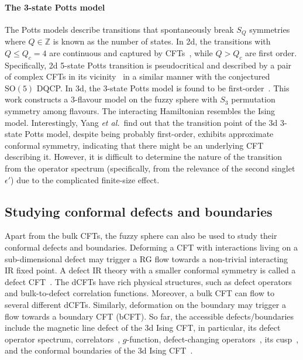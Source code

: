 \documentclass{timesjhep}
\begin{document}
\paragraph{The 3-state Potts model~\cite{Yang2025}}

The Potts models describe transitions that spontaneously break $S_Q$ symmetries where $Q\in\mathbb{Z}$ is known as the number of states. In 2d, the transitions with $Q\leq Q_c=4$ are continuous and captured by CFTs~\cite{Dotsenko1984Potts}, while $Q>Q_c$ are first order. Specifically, 2d 5-state Potts transition is pseudocritical and described by a pair of complex CFTs in its vicinity~\cite{Tang2024Potts} in a similar manner with the conjectured $\mathrm{SO}(5)$ DQCP. In 3d, the 3-state Potts model is found to be first-order~\cite{Barkema1991Potts,Chester2022Potts}. This work constructs a 3-flavour model on the fuzzy sphere with $S_3$ permutation symmetry among flavours. The interacting Hamiltonian resembles the Ising model. Interestingly, Yang \textit{et al.}~find out that the transition point of the 3d 3-state Potts model, despite being probably first-order, exhibits approximate conformal symmetry, indicating that there might be an underlying CFT describing it. However, it is difficult to determine the nature of the transition from the operator spectrum (specifically, from the relevance of the second singlet $\epsilon'$) due to the complicated finite-size effect.

\subsection{Studying conformal defects and boundaries}

Apart from the bulk CFTs, the fuzzy sphere can also be used to study their conformal defects and boundaries. Deforming a CFT with interactions living on a sub-dimensional defect may trigger a RG flow towards a non-trivial interacting IR fixed point. A defect IR theory with a smaller conformal symmetry is called a defect CFT~\cite{Billo2013Defect,Billo2016Defect}. The dCFTs have rich physical structures, such as defect operators and bulk-to-defect correlation functions. Moreover, a bulk CFT can flow to several different dCFTs. Similarly, deformation on the boundary may trigger a flow towards a boundary CFT (bCFT). So far, the accessible defects/boundaries include the magnetic line defect of the 3d Ising CFT, in particular, its defect operator spectrum, correlators~\cite{Hu2023Aug}, $g$-function, defect-changing operators~\cite{Zhou2024Jan}, its cusp~\cite{Cuomo2024}, and the conformal boundaries of the 3d Ising CFT~\cite{Zhou2024Jul,Dedushenko2024}.
\end{document}
